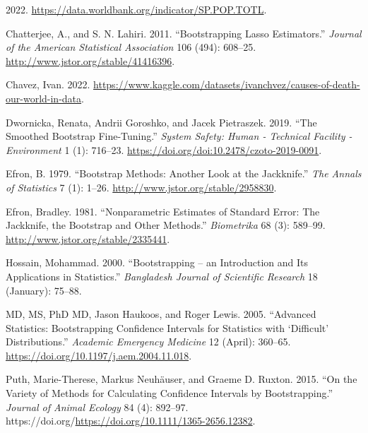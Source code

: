 \documentclass[
  letterpaper,
  DIV=11,
  numbers=noendperiod]{scrartcl}
\newlength{\cslhangindent}
\newlength{\cslentryspacingunit} %
\newenvironment{CSLReferences}[2] %
 {%
  \setlength{\parindent}{0pt}
  \ifodd #1
  \let\oldpar\par
  \def\par{\hangindent=\cslhangindent\oldpar}
  \fi
  \setlength{\parskip}{#2\cslentryspacingunit}
 }%
 {}
\begin{document}
\hypertarget{refs}{}
\begin{CSLReferences}{1}{0}
\leavevmode{}%
2022. \url{https://data.worldbank.org/indicator/SP.POP.TOTL}.

\leavevmode{}%
Chatterjee, A., and S. N. Lahiri. 2011. {``Bootstrapping Lasso
Estimators.''} \emph{Journal of the American Statistical Association}
106 (494): 608--25. \url{http://www.jstor.org/stable/41416396}.

\leavevmode{}%
Chavez, Ivan. 2022.
\url{https://www.kaggle.com/datasets/ivanchvez/causes-of-death-our-world-in-data}.

\leavevmode{}%
Dwornicka, Renata, Andrii Goroshko, and Jacek Pietraszek. 2019. {``The
Smoothed Bootstrap Fine-Tuning.''} \emph{System Safety: Human -
Technical Facility - Environment} 1 (1): 716--23.
\url{https://doi.org/doi:10.2478/czoto-2019-0091}.

\leavevmode{}%
Efron, B. 1979. {``Bootstrap Methods: Another Look at the Jackknife.''}
\emph{The Annals of Statistics} 7 (1): 1--26.
\url{http://www.jstor.org/stable/2958830}.

\leavevmode{}%
Efron, Bradley. 1981. {``Nonparametric Estimates of Standard Error: The
Jackknife, the Bootstrap and Other Methods.''} \emph{Biometrika} 68 (3):
589--99. \url{http://www.jstor.org/stable/2335441}.

\leavevmode{}%
Hossain, Mohammad. 2000. {``Bootstrapping -- an Introduction and Its
Applications in Statistics.''} \emph{Bangladesh Journal of Scientific
Research} 18 (January): 75--88.

\leavevmode{}%
MD, MS, PhD MD, Jason Haukoos, and Roger Lewis. 2005. {``Advanced
Statistics: Bootstrapping Confidence Intervals for Statistics with
{`Difficult'} Distributions.''} \emph{Academic Emergency Medicine} 12
(April): 360--65. \url{https://doi.org/10.1197/j.aem.2004.11.018}.

\leavevmode{}%
Puth, Marie-Therese, Markus Neuhäuser, and Graeme D. Ruxton. 2015. {``On
the Variety of Methods for Calculating Confidence Intervals by
Bootstrapping.''} \emph{Journal of Animal Ecology} 84 (4): 892--97.
https://doi.org/\url{https://doi.org/10.1111/1365-2656.12382}.


\end{CSLReferences}
\end{document}
